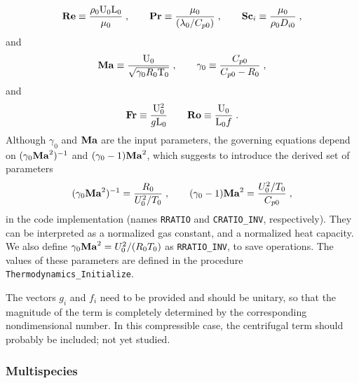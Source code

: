 \begin{equation}
    \mathrm{\bf Re} \equiv \frac{\rho_0 \mathrm{U}_0 \mathrm{L}_0}{\mu_0}\;, \qquad
    \mathrm{\bf Pr} \equiv \frac{\mu_0}{(\lambda_0/C_{p0})}\;, \qquad
    \mathrm{\bf Sc}_i \equiv \frac{\mu_0}{\rho_0 D_{i0}}\;,
\end{equation}
and
\begin{equation}
    \mathrm{\bf Ma}  \equiv \frac{\mathrm{U}_0}{\sqrt{\gamma_0 R_0 \mathrm{T}_0}}\;, \qquad
    \gamma_0 \equiv \frac{C_{p0}}{C_{p0}-R_0}\;,
\end{equation}
and
\begin{equation}
    \mathrm{\bf Fr} \equiv \frac{\mathrm{U}_0^2}{g\mathrm{L}_0} \qquad \mathrm{\bf Ro} \equiv \frac{\mathrm{U}_0}{\mathrm{L}_0f} \;.
\end{equation}
Although $\gamma_0$ and $\mathrm{\bf Ma}$ are the input parameters, the governing equations depend on $(\gamma_0\mathrm{\bf Ma}^2)^{-1}$ and $(\gamma_0-1)\mathrm{\bf Ma}^2$, which suggests to introduce the derived set of parameters
\begin{equation}
    (\gamma_0\mathrm{\bf Ma}^2)^{-1}=\frac{R_0}{U^2_0/T_0}\;,\qquad (\gamma_0-1)\mathrm{\bf Ma}^2 =\frac{U_0^2/T_0}{C_{p0}} \;,
\end{equation}
in the code implementation (names \texttt{RRATIO} and \texttt{CRATIO\_INV}, respectively). They can be interpreted as a normalized gas constant, and a normalized heat capacity. We also define $\gamma_0\mathrm{\bf Ma}^2=U_0^2/(R_0T_0)$ as \texttt{RRATIO\_INV}, to save operations. The values of these parameters are defined in the procedure \texttt{Thermodynamics\_Initialize}.

The vectors $g_i$ and $f_i$ need to be provided and should be unitary, so that the magnitude of the term is completely determined by the corresponding nondimensional number. In this compressible case, the centrifugal term should probably be included; not yet studied.

\subsubsection{Multispecies}

